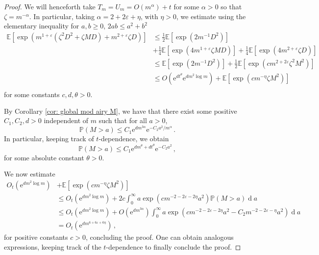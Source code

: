 \documentclass[11pt, reqno]{amsart}
\numberwithin{equation}{section}
\newcommand{\PP}{\ensuremath{\mathbb{P}}}
\newcommand{\diff}{\ensuremath{\operatorname{d}\!}}
\begin{document}
\begin{proof}
We will henceforth take $T_m = U_m = O(m^{\alpha})+t$ for some $\alpha >0$ so that $\zeta = m^{-\alpha}$. In particular, taking $\alpha = 2+2\varepsilon + \eta$, with $\eta >0 $, we estimate using the elementary inequality for $a,b\ge 0$, $2ab\le a^2 + b^2$
\begin{align*}
         \mathbb{E}\left [\exp\left(m^{1+\varepsilon}(\zeta^2 D^2 + \zeta MD) + m^{2+\varepsilon} \zeta D\right) \right ]&\le \frac{1}{2}\mathbb{E}\left [\exp\left(2m^{-1}D^2 \right) \right ]\\
         &+ \frac{1}{4}\mathbb{E}\left [\exp\left(4m^{1+\varepsilon}\zeta MD \right) \right ] + \frac{1}{4}\mathbb{E}\left[\exp\left( 4 m^{2+\varepsilon} \zeta D\right)\right]\\
         & \le \mathbb{E}\left [\exp\left(2m^{-1}D^2 \right) \right ]+ \frac{1}{2}\mathbb{E}\left [\exp\left(c m^{2+2\varepsilon}\zeta^2 M^2 \right) \right ]\\
         & \le O(\mathrm{e}^{dt^\theta}\mathrm{e}^{dm^{2}\log m }) + \mathbb{E}\left [\exp\left(cm^{-\eta}\zeta M^2 \right) \right ]\\
    \end{align*}
for some constants $c, d, \theta>0$.

By Corollary \ref{cor: global mod airy M}, we  have that there exist some positive $C_1, C_2,d > 0$ independent of $m$ such that for all $a>0$,
     \begin{equation*}
     \PP(M> a) \le C_1 \mathrm{e}^{dm^{3\alpha}} \mathrm{e}^{-C_2 a^2/m^\alpha}\,.
     \end{equation*}
In particular, keeping track of $t$-dependence, we obtain
   \begin{equation*}
     \PP(M> a) \le C_1 \mathrm{e}^{dm^{\theta}+dt^\theta} \mathrm{e}^{-C_2 a^2}\,,
     \end{equation*}
for some absolute constant $\theta>0$.

We now estimate
\begin{align*}
    O_t(\mathrm{e}^{dm^{2}\log m }) &+ \mathbb{E}\left [\exp\left(cm^{-\eta}\zeta M^2 \right) \right ]\\
         & \le O_t(\mathrm{e}^{dm^{2}\log m }) + 2c\displaystyle\int_{0}^{\infty} a\exp\left(cm^{-2-2\varepsilon -2\eta} a^2 \right)\PP(M > a)\diff a \\
         & \le O_t(\mathrm{e}^{dm^{2}\log m }) + O(\mathrm{e}^{dm^{3\alpha}})\displaystyle\int_{0}^{\infty} a\exp\left(cm^{-2-2\varepsilon -2\eta} a^2 - C_2  m^{-2-2\varepsilon -\eta}a^2 \right)\diff a \\
         & = O_t(\mathrm{e}^{dm^{6+6\varepsilon + 6\eta}})\,,
\end{align*}
for positive constants $c>0$, concluding the proof. One can obtain analogous expressions, keeping track of the $t$-dependence to finally conclude the proof.
\end{proof}
\end{document}
